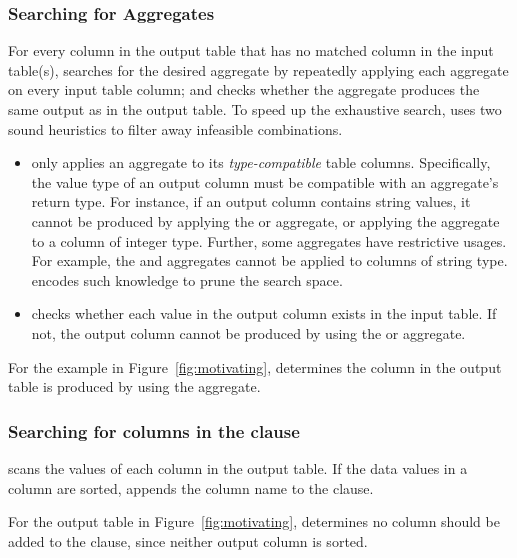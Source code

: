 
\subsubsection{Searching for Aggregates}
\label{sec:agg_search}

For every column in the output table that has no matched
column in the input table(s),
\ourtool searches for the desired aggregate by
repeatedly applying each aggregate on
every input table column; and checks whether
the aggregate produces the same output 
as in the output table. To speed up the exhaustive search,
\ourtool uses two sound heuristics to filter away infeasible
combinations.


\begin{itemize}
\item \ourtool only applies an aggregate
to its \textit{type-compatible} table columns. Specifically,
the value type of an output column must be compatible with an
aggregate's return type. For instance, if an output column
contains string values, it cannot be produced by applying the 
or  aggregate, or 
applying the  aggregate to a column of integer type.
Further, some aggregates have restrictive usages.
For example, the 
and  aggregates cannot be applied to columns of string type.
\ourtool encodes such knowledge to prune the search space.

\item \ourtool checks whether each value in the output
column exists in the input table. If not, the
output column cannot be produced by using
the  or  aggregate.
\end{itemize}

For the example in Figure~\ref{fig:motivating}, \ourtool
determines the  column in the output
table is produced by using the  aggregate.



\subsubsection{Searching for columns in the  clause}
\label{sec:orderby}
\ourtool scans the values of each column in the output table. If
the data values in a column are sorted, \ourtool
appends the column name to the  clause.

For the output table in Figure~\ref{fig:motivating}, \ourtool
determines no column should be added to the  clause,
since neither output column is sorted.

